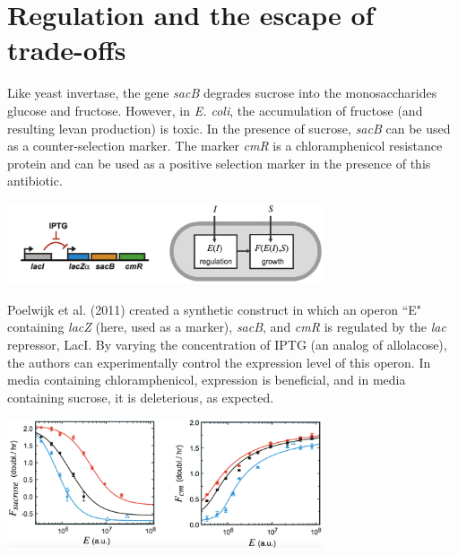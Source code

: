 \documentclass{article}
\begin{document}
\section*{Regulation and the escape of trade-offs}

Like yeast invertase, the gene \textit{sacB} degrades sucrose into the monosaccharides glucose and fructose. However, in \textit{E. coli}, the accumulation of fructose (and resulting levan production) is toxic. In the presence of sucrose, \textit{sacB} can be used as a counter-selection marker. The marker \textit{cmR} is a chloramphenicol resistance protein and can be used as a positive selection marker in the presence of this antibiotic.

\begin{center}
\includegraphics[width=0.7\textwidth]{poelwijk_design.pdf}
\end{center}

Poelwijk et al. (2011) created a synthetic construct in which an operon ``E" containing \textit{lacZ} (here, used as a marker), \textit{sacB}, and \textit{cmR} is regulated by the \textit{lac} repressor, LacI. By varying the concentration of IPTG (an analog of allolacose), the authors can experimentally control the expression level of this operon. In media containing chloramphenicol, expression is beneficial, and in media containing sucrose, it is deleterious, as expected.

\begin{center}
\includegraphics[width=0.7\textwidth]{fitness_vs_expression.pdf}
\end{center}
\end{document}
